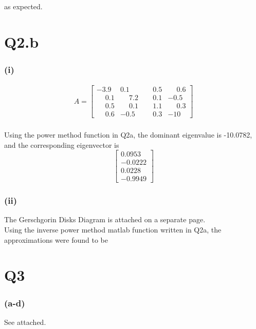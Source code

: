 \documentclass[10pt,a4paper]{article}
\numberwithin{equation}{section}
\begin{document}
		
		
		\noindent as expected.
	
	
	
	
	\section*{Q2.b}
	\subsubsection*{(i)}

		\[\begin{aligned}A =
			\begin{bmatrix}
				-3.9 & 0.1 & \phantom{-}0.5 & \phantom{-}0.6\\
				\phantom{-}0.1 &\phantom{-}7.2 & \phantom{-}0.1 & -0.5\\
				\phantom{-}0.5 & \phantom{-}0.1 & \phantom{-}1.1 & \phantom{-}0.3\\
				\phantom{-}0.6 & -0.5 & \phantom{-}0.3 & -10 
				\end{bmatrix}
				\end{aligned}
				\]\\
				Using the power method function in Q2a, the dominant eigenvalue is -10.0782, and the corresponding eigenvector is
				\[\begin{bmatrix}
					0.0953 \\ -0.0222\\0.0228\\-0.9949
					\end{bmatrix}\]

	\subsubsection*{(ii)}
	The Gerschgorin Disks Diagram is attached on a separate page.\\
	Using the inverse power method matlab function written in Q2a, the approximations were found to be 
	
	
		
	
	
	
		
	\section*{Q3}
	\subsubsection*{(a-d)}
	See attached.
	
\end{document}
